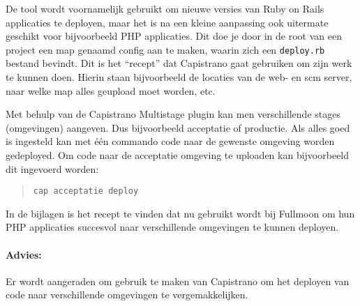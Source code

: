 De tool wordt voornamelijk gebruikt om nieuwe versies van Ruby on Rails applicaties te deployen, maar het is na een kleine aanpassing ook uitermate geschikt voor bijvoorbeeld PHP applicaties. Dit doe je door in de root van een project een map genaamd config aan te maken, waarin zich een \texttt{deploy.rb} bestand bevindt. Dit is het ``recept'' dat Capistrano gaat gebruiken om zijn werk te kunnen doen. Hierin staan bijvoorbeeld de locaties van de web- en {\sc scm} server, naar welke map alles geupload moet worden, etc.

Met behulp van de Capistrano Multistage plugin\cite{capistranomultistage} kan men verschillende stages (omgevingen) aangeven. Dus bijvoorbeeld acceptatie of productie. Als alles goed is ingesteld kan met één commando code naar de gewenste omgeving worden gedeployed. Om code naar de acceptatie omgeving te uploaden kan bijvoorbeeld dit ingevoerd worden:

\begin{quote}
  \texttt{cap acceptatie deploy}
\end{quote}

In de bijlagen is het recept te vinden dat nu gebruikt wordt bij Fullmoon om hun PHP applicaties succesvol naar verschillende omgevingen te kunnen deployen.

\paragraph{Advies:} Er wordt aangeraden om gebruik te maken van Capistrano om het deployen van code naar verschillende omgevingen te vergemakkelijken.
